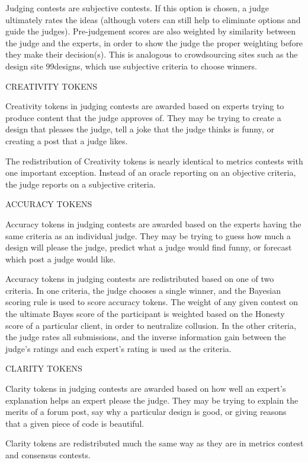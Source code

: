 Judging contests are subjective contests. If this option is chosen, a
judge ultimately rates the ideas (although voters can still help to
eliminate options and guide the judges). Pre-judgement scores are also
weighted by similarity between the judge and the experts, in order to
show the judge the proper weighting before they make their decision(s).
This is analogous to crowdsourcing sites such as the design site
99designs, which use subjective criteria to choose winners.

CREATIVITY TOKENS

Creativity tokens in judging contests are awarded based on experts
trying to produce content that the judge approves of. They may be trying
to create a design that pleases the judge, tell a joke that the judge
thinks is funny, or creating a post that a judge likes.

The redistribution of Creativity tokens is nearly identical to metrics
contests with one important exception. Instead of an oracle reporting on
an objective criteria, the judge reports on a subjective criteria.

ACCURACY TOKENS

Accuracy tokens in judging contests are awarded based on the experts
having the same criteria as an individual judge. They may be trying to
guess how much a design will please the judge, predict what a judge
would find funny, or forecast which post a judge would like.

Accuracy tokens in judging contests are redistributed based on one of
two criteria. In one criteria, the judge chooses a single winner, and
the Bayesian scoring rule is used to score accuracy tokens. The weight
of any given contest on the ultimate Bayes score of the participant is
weighted based on the Honesty score of a particular client, in order to
neutralize collusion. In the other criteria, the judge rates all
submissions, and the inverse information gain between the judge's
ratings and each expert's rating is used as the criteria.

CLARITY TOKENS

Clarity tokens in judging contests are awarded based on how well an
expert's explanation helps an expert please the judge. They may be
trying to explain the merits of a forum post, say why a particular
design is good, or giving reasons that a given piece of code is
beautiful.

Clarity tokens are redistributed much the same way as they are in
metrics contest and consensus contests.

